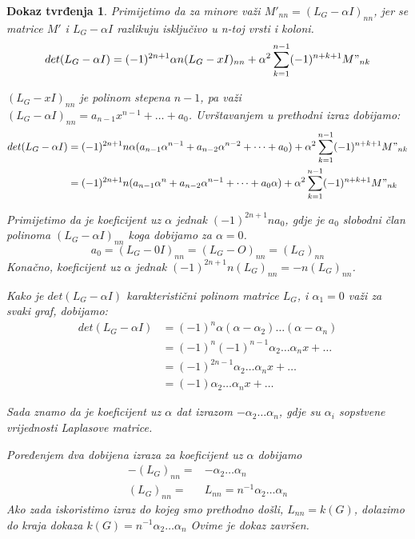 \documentclass[11pt]{article}
\newtheorem*{custom_proof}{Dokaz tvrđenja}
\begin{document}
\begin{custom_proof}
		Primijetimo da za minore važi $M'_{nn} = (L_G - \alpha I)_{nn}$, jer se matrice  $M'$ i $L_G - \alpha I$ razlikuju isključivo u n-toj vrsti i koloni.
		\[
		det(L_G - \alpha I) = (-1)^{2n+1} \alpha n (L_G- xI)_{nn} + \alpha^2 \sum_{k=1}^{n-1}(-1)^{n+k+1}M"_{nk}
		\]
		
		$(L_G- xI)_{nn}$ je polinom stepena $n-1$, pa važi $(L_G- \alpha I)_{nn} = a_{n-1}x^{n-1} + \dots + a_0$.
		Uvrštavanjem u prethodni izraz dobijamo:
		\[
			\begin{split}
				det(L_G - \alpha I) &= (-1)^{2n+1} n \alpha (a_{n-1}\alpha^{n-1} + a_{n-2}\alpha^{n-2} + \dots + a_0) + \alpha^2 \sum_{k=1}^{n-1}(-1)^{n+k+1}M"_{nk} \\
									&= (-1)^{2n+1} n (a_{n-1}\alpha^n + a_{n-2}\alpha^{n-1} + \dots + a_0 \alpha) + \alpha^2 \sum_{k=1}^{n-1}(-1)^{n+k+1}M"_{nk}
			\end{split}
		\]

		Primijetimo da je koeficijent uz $\alpha$ jednak $(-1)^{2n+1} n a_0$, gdje je $a_0$ slobodni član polinoma $(L_G- \alpha I)_{nn}$ koga dobijamo za $\alpha=0$.
		\[
		  a_0 = (L_G- 0I)_{nn} = (L_G- O)_{nn} = (L_G)_{nn}
		\]
		Konačno, koeficijent uz $\alpha$ jednak $ (-1)^{2n+1} n (L_G)_{nn} = - n (L_G)_{nn}$.
	
		Kako je $det(L_G - \alpha I)$ karakteristični polinom matrice $L_G$, i $\alpha_1 = 0$ važi za svaki graf, dobijamo:
		\[
			\begin{split}
				det(L_G - \alpha I)  & = (-1)^n \alpha (\alpha - \alpha_2) \dots (\alpha - \alpha_n) \\
									 & = (-1)^n(-1)^{n-1} \alpha_2 \dots \alpha_n x + \dots \\
									 & = (-1)^{2n-1} \alpha_2 \dots \alpha_n x + \dots \\
								     & = (-1) \alpha_2 \dots \alpha_n x + \dots 
									\end{split}
									\]

		Sada znamo da je koeficijent uz $\alpha$ dat izrazom $- \alpha_2 \dots \alpha_n$, gdje su $\alpha_i$ sopstvene vrijednosti Laplasove matrice. 
	
		
		
		Poređenjem dva dobijena izraza za koeficijent uz $\alpha$ dobijamo 
		\[
			\begin{split} 
				-(L_G)_{nn}  = &  - \alpha_2 \dots \alpha_n \\
				(L_G)_{nn}  = &  L_{nn} = n^{-1} \alpha_2 \dots \alpha_n 
			\end{split} 
		\]
		Ako zada iskoristimo izraz do kojeg smo prethodno došli, $ L_{nn} = k(G)$, dolazimo do kraja dokaza $k(G) = n^{-1} \alpha_2 \dots \alpha_n$
		Ovime je dokaz završen.
		
	\end{custom_proof} 
		
\end{document}

